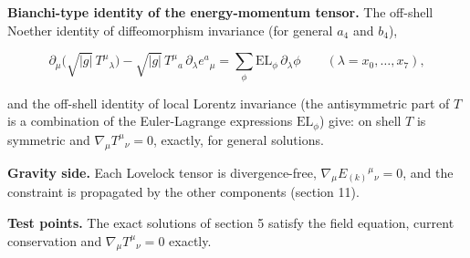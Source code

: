\documentclass[11pt]{article}
\begin{document}
\textbf{Bianchi-type identity of the energy-momentum tensor.} The off-shell Noether identity of diffeomorphism invariance (for general $a_4$ and $b_4$),

\[
\partial_\mu\big(\sqrt{|g|}\,T^\mu{}_\lambda\big) - \sqrt{|g|}\,T^\mu{}_a\,\partial_\lambda e^a{}_\mu = \sum_\phi \mathrm{EL}_\phi\,\partial_\lambda\phi \qquad (\lambda = x_0, \ldots, x_7),
\]

and the off-shell identity of local Lorentz invariance (the antisymmetric part of $T$ is a combination of the Euler-Lagrange expressions $\mathrm{EL}_\phi$) give: on shell $T$ is symmetric and $\nabla_\mu T^\mu{}_\nu = 0$, exactly, for general solutions.

\textbf{Gravity side.} Each Lovelock tensor is divergence-free, $\nabla_\mu E_{(k)}{}^\mu{}_\nu = 0$, and the constraint is propagated by the other components (section 11).

\textbf{Test points.} The exact solutions of section 5 satisfy the field equation, current conservation and $\nabla_\mu T^\mu{}_\nu = 0$ exactly.
\end{document}
